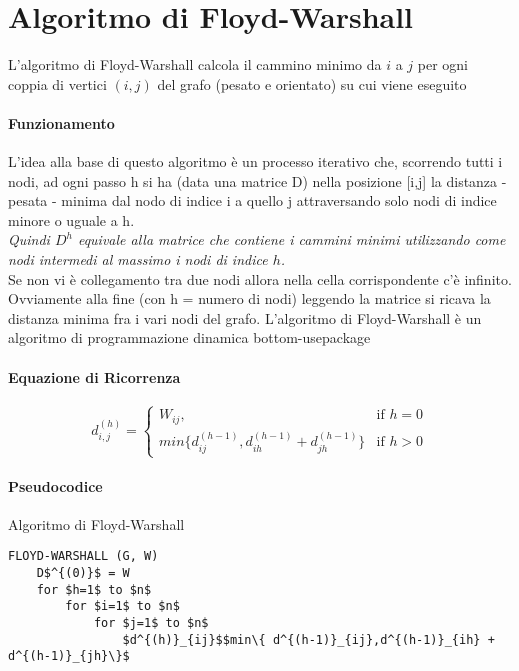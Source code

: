 \documentclass[12pt, a4paper, openany]{book}
\begin{document}
\section{Algoritmo di Floyd-Warshall}
L'algoritmo di Floyd-Warshall calcola il cammino minimo da $i$ a $j$ per ogni coppia di vertici $(i,j)$ del grafo (pesato e orientato) su cui viene eseguito

\paragraph{Funzionamento}
L'idea alla base di questo algoritmo è un processo iterativo che, scorrendo tutti i nodi, ad ogni passo h si ha
(data una matrice D) nella posizione [i,j] la distanza - pesata - minima dal nodo di indice i a quello j attraversando
solo nodi di indice minore o uguale a h.\\
\textit{Quindi $D^h$ equivale alla matrice che contiene i cammini minimi utilizzando come nodi intermedi al massimo i nodi di indice $h$.}
\\Se non vi è collegamento tra due nodi allora nella cella corrispondente c'è infinito.
Ovviamente alla fine (con h = numero di nodi) leggendo la matrice si ricava la distanza minima fra i vari nodi del grafo.
L'algoritmo di Floyd-Warshall è un algoritmo di programmazione dinamica bottom-usepackage

\paragraph{Equazione di Ricorrenza}

\begin{equation*}
	d^{(h)}_{i,j}= \begin{cases}
		W_{ij},                                                & \text{if $h = 0$} \\
		min\{ d^{(h-1)}_{ij},d^{(h-1)}_{ih} + d^{(h-1)}_{jh}\} & \text{if $h > 0$}
	\end{cases}
\end{equation*}

\paragraph{Pseudocodice} Algoritmo di Floyd-Warshall

\begin{lstlisting}[mathescape=true]
FLOYD-WARSHALL (G, W)
    D$^{(0)}$ = W
    for $h=1$ to $n$
        for $i=1$ to $n$
            for $j=1$ to $n$
                $d^{(h)}_{ij}$$min\{ d^{(h-1)}_{ij},d^{(h-1)}_{ih} + d^{(h-1)}_{jh}\}$


\end{lstlisting}
\end{document}
